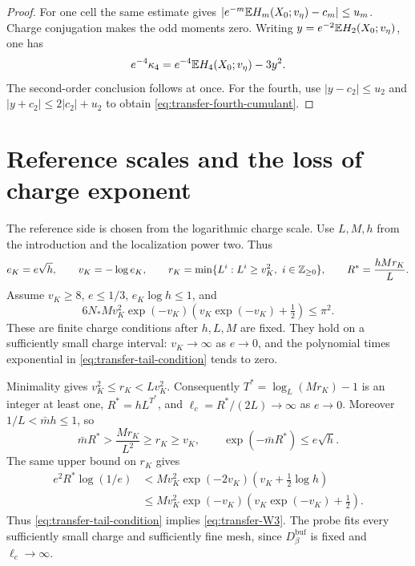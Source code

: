 \begin{proof}
For one cell the same estimate gives
$|e^{-m}\mathbb E H_m(X_0;v_\eta)-c_m|\le u_m$.
Charge conjugation makes the odd moments zero.
Writing $y=e^{-2}\mathbb E H_2(X_0;v_\eta)$, one has
\[
 e^{-4}\kappa_4=e^{-4}\mathbb E H_4(X_0;v_\eta)-3y^2.
\]
The second-order conclusion follows at once.
For the fourth, use $|y-c_2|\le u_2$ and
$|y+c_2|\le2|c_2|+u_2$ to obtain
\eqref{eq:transfer-fourth-cumulant}.
\end{proof}

\section{Reference scales and the loss of charge exponent}\label{sec:vtm-bounds}

The reference side is chosen from the logarithmic charge
scale. Use $L,M,h$ from the introduction and the localization
power two. Thus
\begin{equation}\label{eq:transfer-scale-choice}
 e_K=e\sqrt h,\qquad v_K=-\log e_K,\qquad
 r_K=\min\{L^i:L^i\ge v_K^2,\ i\in\mathbb Z_{\ge0}\},
 \qquad R^*=\frac{hMr_K}{L}.
\end{equation}
Assume $v_K\ge8$, $e\le1/3$, $e_K\log h\le1$, and
\begin{equation}\label{eq:transfer-tail-condition}
 6N_*Mv_K^2 \exp(-v_K)
                 \left(v_K\exp(-v_K)+\tfrac12\right)\le\pi^2.
\end{equation}
These are finite charge conditions after $h,L,M$ are fixed.
They hold on a sufficiently small charge interval:
$v_K\to\infty$ as $e\to0$, and the polynomial times
exponential in \eqref{eq:transfer-tail-condition}
tends to zero.

Minimality gives $v_K^2\le r_K<Lv_K^2$.
Consequently $T^*=\log_L(Mr_K)-1$ is an integer at
least one, $R^*=hL^{T^*}$, and
$\ell_c=R^*/(2L)\to\infty$ as $e\to0$.
Moreover $1/L<\bar mh\le1$, so
\begin{equation}\label{eq:transfer-volume-error}
 \bar mR^*>\frac{Mr_K}{L^2}\ge r_K\ge v_K,
 \qquad \exp(-\bar mR^*)\le e\sqrt h.
\end{equation}
The same upper bound on $r_K$ gives
\begin{align*}
 e^2R^*\log(1/e)
 &<Mv_K^2 \exp(-2v_K)
                          (v_K+\tfrac12\log h)\\
 &\le Mv_K^2 \exp(-v_K)
                          (v_K\exp(-v_K)+\tfrac12).
\end{align*}
Thus \eqref{eq:transfer-tail-condition} implies
\eqref{eq:transfer-W3}.
The probe fits every sufficiently small charge and
sufficiently fine mesh, since $D_\beta^{\mathrm{buf}}$
is fixed and $\ell_c\to\infty$.

